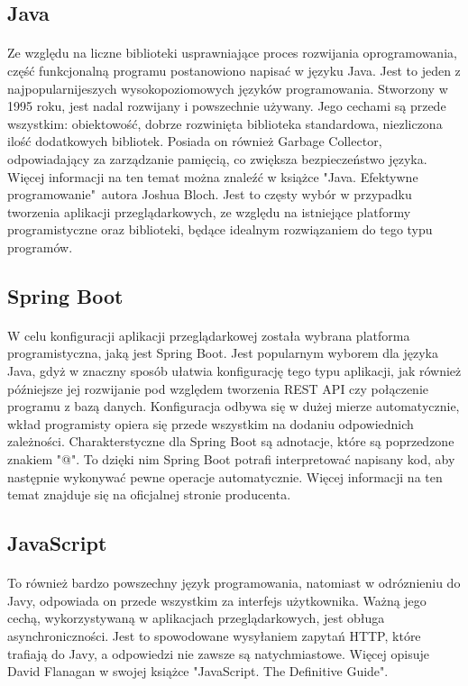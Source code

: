 \subsection{Java}
\paragraph{}
Ze względu na liczne biblioteki usprawniające proces rozwijania oprogramowania, część funkcjonalną programu postanowiono napisać w języku Java. Jest to jeden z najpopularnijeszych wysokopoziomowych języków programowania. Stworzony w 1995 roku, jest nadal rozwijany i powszechnie używany. Jego cechami są przede wszystkim: obiektowość, dobrze rozwinięta biblioteka standardowa, niezliczona ilość dodatkowych bibliotek. Posiada on również Garbage Collector, odpowiadający za zarządzanie pamięcią, co zwiększa bezpieczeństwo języka. Więcej informacji na ten temat można znaleźć w książce "Java. Efektywne programowanie"\ autora Joshua Bloch. Jest to częsty wybór w przypadku tworzenia aplikacji przeglądarkowych, ze względu na istniejące platformy programistyczne oraz biblioteki, będące idealnym rozwiązaniem do tego typu programów.

\subsection{Spring Boot}
\paragraph{}
W celu konfiguracji aplikacji przeglądarkowej została wybrana platforma programistyczna, jaką jest Spring Boot. Jest popularnym wyborem dla języka Java, gdyż w znaczny sposób ułatwia konfigurację tego typu aplikacji, jak również późniejsze jej rozwijanie pod względem tworzenia REST API czy połączenie programu z bazą danych. Konfiguracja odbywa się w dużej mierze automatycznie, wkład programisty opiera się przede wszystkim na dodaniu odpowiednich zależności. Charakterstyczne dla Spring Boot są adnotacje, które są poprzedzone znakiem "@". To dzięki nim Spring Boot potrafi interpretować napisany kod, aby następnie wykonywać pewne operacje automatycznie. Więcej informacji na ten temat znajduje się na oficjalnej stronie producenta.

\subsection{JavaScript}
\paragraph{}
To również bardzo powszechny język programowania, natomiast w odróznieniu do Javy, odpowiada on przede wszystkim za interfejs użytkownika. Ważną jego cechą, wykorzystywaną w aplikacjach przeglądarkowych, jest obługa asynchroniczności. Jest to spowodowane wysyłaniem zapytań HTTP, które trafiają do Javy, a odpowiedzi nie zawsze są natychmiastowe. Więcej opisuje David Flanagan w swojej książce "JavaScript. The Definitive Guide".

